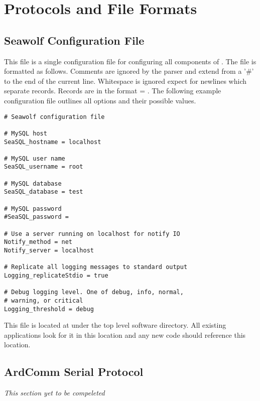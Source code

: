 
\newpage
\section{Protocols and File Formats} \label{formats}
\subsection{Seawolf Configuration File} \label{formatsseawolfconf}
This file is a single configuration file for configuring all components of
\libseawolf{}. The file is formatted as follows. Comments are ignored by the
parser and extend from a '\#' to the end of the current line. Whitespace is
ignored expect for newlines which separate records. Records are in the format
 = . The following example configuration file
outlines all options and their possible values.
\begin{lstlisting}[caption=Example Seawolf configuration file]
# Seawolf configuration file

# MySQL host
SeaSQL_hostname = localhost

# MySQL user name
SeaSQL_username = root

# MySQL database
SeaSQL_database = test

# MySQL password
#SeaSQL_password = 

# Use a server running on localhost for notify IO
Notify_method = net
Notify_server = localhost

# Replicate all logging messages to standard output
Logging_replicateStdio = true

# Debug logging level. One of debug, info, normal,
# warning, or critical
Logging_threshold = debug
\end{lstlisting}

This file is located at  under the top level software
directory. All existing applications look for it in this location and any new
code should reference this location.

\subsection{ArdComm Serial Protocol} \label{formatsardcomm}
\textit{This section yet to be compeleted}

